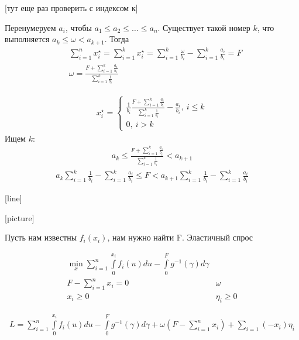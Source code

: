 \documentclass[12pt,a4paper,titlepage,oneside]{book}
\theoremstyle{definition}
\theoremstyle{plain}
\theoremstyle{remark}
\theoremstyle{remark}
\theoremstyle{plain}
\theoremstyle{plain}
\begin{document}
[тут еще раз проверить с индексом к]

Перенумеруем $a_i$, чтобы $a_1 \leq a_2 \leq \dots \leq a_n$.
Существует такой номер $k$, что выполняется $a_k \leq \omega < a_{k+1}$. Тогда
\begin{align*}
&\sum \limits_{i=1}^n x_i^\star = \sum \limits_{i=1}^k x_i^\star  = \sum\limits_{i=1}^k \frac{\omega}{b_i} - \sum\limits_{i=1}^k \frac{a_i}{b_i} = F\\
&\omega = \frac{F + \sum \limits_{i=1}^k \frac{a_i}{b_i}}{\sum\limits_{i=1}^k \frac{1}{b_i}}
\end{align*}

\begin{align*}
x_i^\star = \begin{cases}
\frac{1}{b_i}\frac{F+\sum\limits_{i=1}^k \frac{a_i}{b_i}}{\sum\limits_{i=1}^k \frac{1}{b_i}} - \frac{a_i}{b_i}, \: i \leq k\\
0, \: i > k
\end{cases}
\end{align*}
Ищем $k$:
\begin{align*}
a_k \leq \frac{F+\sum\limits_{i=1}^k \frac{a_i}{b_i}}{\sum\limits_{i=1}^k \frac{1}{b_i}} < a_{k+1}
\end{align*}
\begin{align*}
a_k\sum\limits_{i=1}^k \frac{1}{b_i} - \sum\limits_{i=1}^k \frac{a_i}{b_i} \leq F < a_{k+1}\sum\limits_{i=1}^k \frac{1}{b_i} - \sum\limits_{i=1}^k \frac{a_i}{b_i}
\end{align*}


[line]

[picture]

Пусть нам известны $f_i(x_i)$, нам  нужно найти F.
Эластичный спрос

\begin{align*}
&\min\limits_x \sum\limits_{i=1}^n \int\limits_0^{x_i} f_i(u)du - \int\limits_0^F g^{-1}(\gamma)d\gamma & \\
&F - \sum\limits_{i=1}^n x_i = 0 &\omega&\\
&x_i \geq 0 &\eta_i \geq 0&
\end{align*}

\begin{align*}
L = \sum \limits_{i=1}^n \int\limits_0^{x_i} f_i(u)du - \int\limits_0^F g^{-1}(\gamma) d\gamma + \omega(F - \sum \limits_{i=1}^n x_i) + \sum\limits_{i=1} (-x_i) \eta_i
\end{align*}
\end{document}
